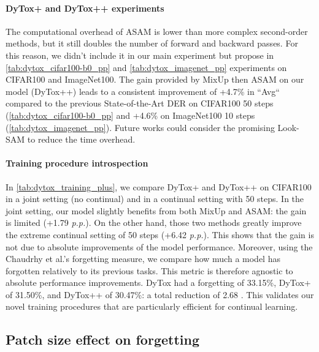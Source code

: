 \paragraph{DyTox+ and DyTox++ experiments} The computational overhead of ASAM is lower than more
complex second-order methods, but it still doubles the number of forward and backward passes. For
this reason, we didn't include it in our main experiment but propose in \autoref{tab:dytox_cifar100-b0_pp}
and \autoref{tab:dytox_imagenet_pp} experiments on CIFAR100 and ImageNet100. The gain provided by MixUp
then ASAM on our model (DyTox++) leads to a consistent improvement of +4.7\% in ``Avg`` compared to
the previous State-of-the-Art DER \cite{yan2021der} on CIFAR100 50 steps
(\autoref{tab:dytox_cifar100-b0_pp} and +4.6\% on ImageNet100 10 steps (\autoref{tab:dytox_imagenet_pp}). Future
works could consider the promising Look-SAM \cite{liu2021looksam} to reduce the time overhead.

\paragraph{Training procedure introspection} In \autoref{tab:dytox_training_plus}, we compare DyTox+ and
DyTox++ on CIFAR100 in a joint setting (no continual) and in a continual setting with 50 steps. In
the joint setting, our model slightly benefits from both MixUp and ASAM: the gain is limited (+1.79
\textit{p.p.}). On the other hand, those two methods greatly improve the extreme continual setting
of 50 steps (+6.42 \textit{p.p.}). This shows that the gain is not due to absolute improvements of
the model performance. Moreover, using the Chaudrhy et al.'s forgetting
\cite{chaudhry2018riemannien_walk} measure, we compare how much a model has forgotten relatively to
its previous tasks. This metric is therefore agnostic to absolute performance improvements. DyTox
had a forgetting of 33.15\%, DyTox+ of 31.50\%, and DyTox++ of 30.47\%: a total reduction of 2.68
\pp. This validates our novel training procedures that are particularly efficient for continual
learning.



\subsection{Patch size effect on forgetting}

